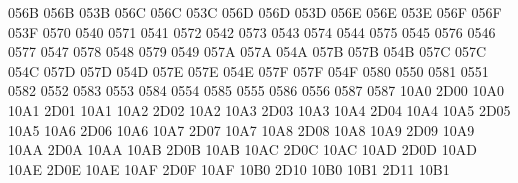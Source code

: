 \setcclcucx 056B 056B 053B %
\setcclcucx 056C 056C 053C %
\setcclcucx 056D 056D 053D %
\setcclcucx 056E 056E 053E %
\setcclcucx 056F 056F 053F %
 0570 0540 %
 0571 0541 %
 0572 0542 %
 0573 0543 %
 0574 0544 %
 0575 0545 %
 0576 0546 %
 0577 0547 %
 0578 0548 %
 0579 0549 %
\setcclcucx 057A 057A 054A %
\setcclcucx 057B 057B 054B %
\setcclcucx 057C 057C 054C %
\setcclcucx 057D 057D 054D %
\setcclcucx 057E 057E 054E %
\setcclcucx 057F 057F 054F %
 0580 0550 %
 0581 0551 %
 0582 0552 %
 0583 0553 %
 0584 0554 %
 0585 0555 %
 0586 0556 %
 0587 0587 %
\setcclcucx 10A0 2D00 10A0 %
\setcclcucx 10A1 2D01 10A1 %
\setcclcucx 10A2 2D02 10A2 %
\setcclcucx 10A3 2D03 10A3 %
\setcclcucx 10A4 2D04 10A4 %
\setcclcucx 10A5 2D05 10A5 %
\setcclcucx 10A6 2D06 10A6 %
\setcclcucx 10A7 2D07 10A7 %
\setcclcucx 10A8 2D08 10A8 %
\setcclcucx 10A9 2D09 10A9 %
\setcclcucx 10AA 2D0A 10AA %
\setcclcucx 10AB 2D0B 10AB %
\setcclcucx 10AC 2D0C 10AC %
\setcclcucx 10AD 2D0D 10AD %
\setcclcucx 10AE 2D0E 10AE %
\setcclcucx 10AF 2D0F 10AF %
\setcclcucx 10B0 2D10 10B0 %
\setcclcucx 10B1 2D11 10B1 %
